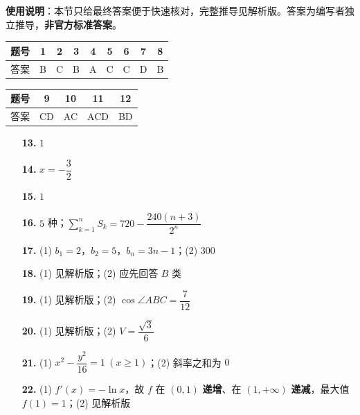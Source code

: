 
\begin{gknotice}
\textbf{使用说明}：本节只给最终答案便于快速核对，完整推导见解析版。答案为编写者独立推导，\textbf{非官方标准答案}。
\end{gknotice}

\begin{center}\begin{tabular}{ccccccccc}
\toprule
题号 & 1 & 2 & 3 & 4 & 5 & 6 & 7 & 8 \\
\midrule
答案 & B & C & B & A & C & C & D & B \\
\bottomrule
\end{tabular}\end{center}

\begin{center}\begin{tabular}{ccccc}
\toprule
题号 & 9 & 10 & 11 & 12 \\
\midrule
答案 & CD & AC & ACD & BD \\
\bottomrule
\end{tabular}\end{center}

\begin{itemize}[leftmargin=2.6em]
  \item[\textbf{13.}] $1$
  \item[\textbf{14.}] $x=-\dfrac32$
  \item[\textbf{15.}] $1$
  \item[\textbf{16.}] $5$ 种；$\displaystyle\sum_{k=1}^{n}S_k=720-\dfrac{240(n+3)}{2^{n}}$
\end{itemize}

\begin{itemize}[leftmargin=2.6em]
  \item[\textbf{17.}] (1) $b_1=2$，$b_2=5$，$b_n=3n-1$；(2) $300$
  \item[\textbf{18.}] (1) 见解析版；(2) 应先回答 $B$ 类
  \item[\textbf{19.}] (1) 见解析版；(2) $\cos\angle ABC=\dfrac7{12}$
  \item[\textbf{20.}] (1) 见解析版；(2) $V=\dfrac{\sqrt3}6$
  \item[\textbf{21.}] (1) $x^{2}-\dfrac{y^{2}}{16}=1\ (x\ge1)$；(2) 斜率之和为 $0$
  \item[\textbf{22.}] (1) $f'(x)=-\ln x$，故 $f$ 在 $(0,1)$ \textbf{递增}、在 $(1,+\infty)$ \textbf{递减}，最大值 $f(1)=1$；(2) 见解析版
\end{itemize}
